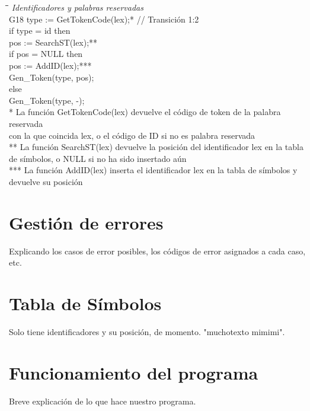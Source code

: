 \documentclass{article}
\begin{document}
\newpage
\begin{tabbing}
    \hspace{1cm}\=\hspace{1cm}\=\hspace{7cm}\=\kill
    \textit{Identificadores y palabras reservadas} \\
    \> G18 \> type := GetTokenCode(lex);*\> // Transición 1:2\\
    \> \hspace{1cm}if type = id then\\
    \> \hspace{2cm}pos := SearchST(lex);**\\
    \> \hspace{2cm}if pos = NULL then\\
    \> \hspace{3cm}pos := AddID(lex);***\\
    \> \hspace{2cm}Gen\_Token(type, pos);\\
    \> \hspace{1cm}else\\
    \> \hspace{2cm}Gen\_Token(type, -);\\
    \>* La función GetTokenCode(lex) devuelve el código de token de la palabra reservada \\
    \>con la que coincida lex, o el código de ID si no es palabra reservada\\
    \>** La función SearchST(lex) devuelve la posición del identificador lex en la tabla \\
    \>de símbolos, o NULL si no ha sido insertado aún\\
    \>*** La función AddID(lex) inserta el identificador lex en la tabla de símbolos y \\
    \>devuelve su posición\\
\end{tabbing}

\section{Gestión de errores}
Explicando los casos de error posibles, los códigos de error asignados a cada caso, etc.

\section{Tabla de Símbolos}
Solo tiene identificadores y su posición, de momento. "muchotexto mimimi".

\section{Funcionamiento del programa}
Breve explicación de lo que hace nuestro programa.
\end{document}
